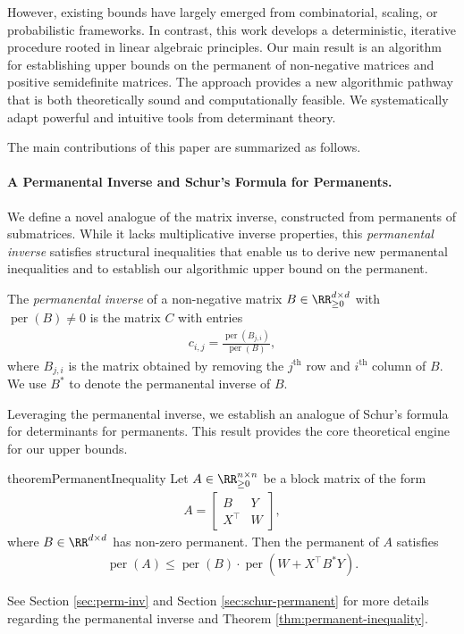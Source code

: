 \documentclass[11pt]{article}
\theoremstyle{definition}
\DeclareMathOperator{\per}{per}
\begin{document}
However, existing bounds have largely emerged from combinatorial, scaling, or probabilistic frameworks. In contrast, this work develops a deterministic, iterative procedure rooted in linear algebraic principles. Our main result is an algorithm for establishing upper bounds on the permanent of non-negative matrices and positive semidefinite matrices. The approach provides a new algorithmic pathway that is both theoretically sound and computationally feasible. We systematically adapt powerful and intuitive tools from determinant theory. 

The main contributions of this paper are summarized as follows.
\paragraph{A Permanental Inverse and Schur's Formula for Permanents.}
We define a novel analogue of the matrix inverse, constructed from permanents of submatrices. While it lacks multiplicative inverse properties, this \emph{permanental inverse} satisfies structural inequalities that enable us to derive new permanental inequalities and to establish our algorithmic upper bound on the permanent.
	\begin{defn}
		The \emph{permanental inverse} of a non-negative matrix $B\in \RR^{d\times d}_{\geq 0}$ with $\per(B)\neq 0$ is the matrix $C$ with entries
		\begin{align*}
			c_{i,j}=\frac{\per(B_{j,i})}{\per(B)},
		\end{align*}
		where $B_{j,i}$ is the matrix obtained by removing the $j^{\text{th}}$ row and $i^{\text{th}}$ column of $B$.
		We use $B^*$ to denote the permanental inverse of $B$.
	\end{defn}
	
Leveraging the permanental inverse, we establish an analogue of Schur's formula for determinants for permanents. This result provides the core theoretical engine for our upper bounds.
	\begin{restatable}{theorem}{PermanentInequality}
		\label{thm:permanent-inequality}
		Let $A \in \RR^{n \times n}_{\geq 0}$ be a block matrix of the form
		\begin{align*}
		A = \begin{bmatrix}
			B & Y \\
			X^{\top} & W
		\end{bmatrix},
		\end{align*}
		where $B \in \RR^{d \times d}$ has non-zero permanent. Then the permanent of $A$ satisfies
		\begin{align}
			\label{eqn:perm-inv-prop} 
		\per(A) \leq \per(B) \cdot \per\left(W + X^{\top} B^* Y \right).
		\end{align}
	\end{restatable}
    See Section \ref{sec:perm-inv} and Section \ref{sec:schur-permanent}  for more details regarding the permanental inverse and Theorem \ref{thm:permanent-inequality}. 
\end{document}
